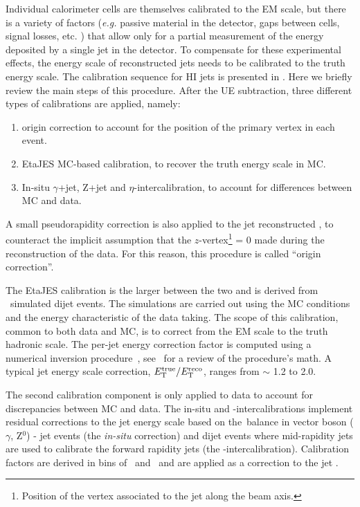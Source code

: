 Individual calorimeter cells are themselves calibrated to the EM scale, but there is a variety of factors (\textit{e.g.} passive material in the detector, gaps between cells, signal losses, etc. \cite{PERF-2011-03}) that allow only for a partial measurement of the energy deposited by a single jet in the detector. To compensate for these experimental effects, the energy scale of reconstructed jets needs to be calibrated to the truth energy scale.
The calibration sequence for HI jets is presented in \cite{Krivos:2706256}.
Here we briefly review the main steps of this procedure.
After the UE subtraction, three different types of calibrations are applied, namely:
\begin{enumerate}
    \item origin correction to account for the position of the primary vertex in each event.
    \item EtaJES MC-based calibration, to recover the truth energy scale in MC.
    \item In-situ $\gamma$+jet, Z+jet and $\eta$-intercalibration, to account for differences between MC and data.
\end{enumerate}

A small pseudorapidity correction is also applied to the jet reconstructed \ETA, to counteract the implicit assumption that the $z$-vertex\footnote{Position of the vertex associated to the jet along the beam axis.} = 0 made during the reconstruction of the data. For this reason, this procedure is called ``origin correction''.

The EtaJES calibration is the larger between the two and is derived from \pythia\ simulated dijet events. The simulations are carried out using the MC conditions and the energy characteristic of the data taking. The scope of this calibration, common to both data and MC, is to correct from the EM scale to the truth hadronic scale. The per-jet energy correction factor is computed using a numerical inversion procedure~\cite{Kosek:1742072, Ouellette:2655891}, see~\cite{Cukierman:2016dkb} for a review of the procedure's math. A typical jet energy scale correction, $E_{\text{T}}^{\text{true}}/E_{\text{T}}^{\text{reco}}$, ranges from $\sim$ 1.2 to 2.0.

The second calibration component is only applied to data to account for discrepancies between MC and data. The in-situ and \ETA-intercalibrations implement residual corrections to the jet energy scale based on the \PT\,balance in vector boson ($\gamma$, Z$^0$) - jet events (the \textit{in-situ} correction) and dijet events where mid-rapidity jets are used to calibrate the forward rapidity jets (the \ETA-intercalibration).
Calibration factors are derived in bins of \PT\ and \ETA\ and are applied as a correction to the jet \PT.
